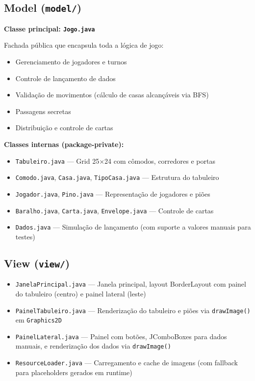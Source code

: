 \documentclass[12pt,a4paper]{report}
\begin{document}
\subsection{Model (\texttt{model/})}

\textbf{Classe principal: \texttt{Jogo.java}}

Fachada pública que encapsula toda a lógica de jogo:

\begin{itemize}
    \item Gerenciamento de jogadores e turnos
    \item Controle de lançamento de dados
    \item Validação de movimentos (cálculo de casas alcançáveis via BFS)
    \item Passagens secretas
    \item Distribuição e controle de cartas
\end{itemize}

\textbf{Classes internas (package-private):}
\begin{itemize}
    \item \texttt{Tabuleiro.java} --- Grid 25×24 com cômodos, corredores e portas
    \item \texttt{Comodo.java}, \texttt{Casa.java}, \texttt{TipoCasa.java} --- Estrutura do tabuleiro
    \item \texttt{Jogador.java}, \texttt{Pino.java} --- Representação de jogadores e piões
    \item \texttt{Baralho.java}, \texttt{Carta.java}, \texttt{Envelope.java} --- Controle de cartas
    \item \texttt{Dados.java} --- Simulação de lançamento (com suporte a valores manuais para testes)
\end{itemize}

\subsection{View (\texttt{view/})}

\begin{itemize}
    \item \texttt{JanelaPrincipal.java} --- Janela principal, layout BorderLayout com painel do tabuleiro (centro) e painel lateral (leste)
    \item \texttt{PainelTabuleiro.java} --- Renderização do tabuleiro e piões via \texttt{drawImage()} em \texttt{Graphics2D}
    \item \texttt{PainelLateral.java} --- Painel com botões, JComboBoxes para dados manuais, e renderização dos dados via \texttt{drawImage()}
    \item \texttt{ResourceLoader.java} --- Carregamento e cache de imagens (com fallback para placeholders gerados em runtime)
\end{itemize}
\end{document}
